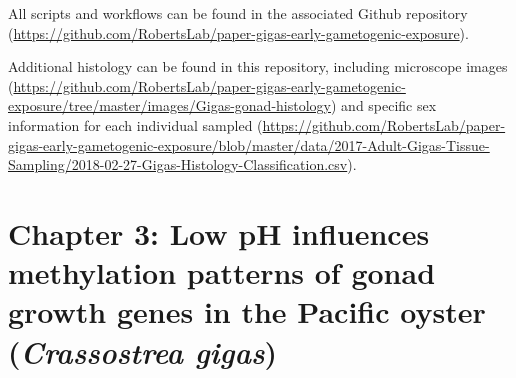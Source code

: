 \documentclass [11pt, proquest] {uwthesis}[2015/03/03]
\begin{document}
All scripts and workflows can be found in the associated Github repository (\url{https://github.com/RobertsLab/paper-gigas-early-gametogenic-exposure}).

Additional histology can be found in this repository, including microscope images (\url{https://github.com/RobertsLab/paper-gigas-early-gametogenic-exposure/tree/master/images/Gigas-gonad-histology}) and specific sex information for each individual sampled (\url{https://github.com/RobertsLab/paper-gigas-early-gametogenic-exposure/blob/master/data/2017-Adult-Gigas-Tissue-Sampling/2018-02-27-Gigas-Histology-Classification.csv}).

\hypertarget{chapter-3-low-ph-influences-methylation-patterns-of-gonad-growth-genes-in-the-pacific-oyster-crassostrea-gigas}{%
\section{\texorpdfstring{Chapter 3: Low pH influences methylation patterns of gonad growth genes in the Pacific oyster (\emph{Crassostrea gigas})}{Chapter 3: Low pH influences methylation patterns of gonad growth genes in the Pacific oyster (Crassostrea gigas)}}\label{chapter-3-low-ph-influences-methylation-patterns-of-gonad-growth-genes-in-the-pacific-oyster-crassostrea-gigas}}
\end{document}
